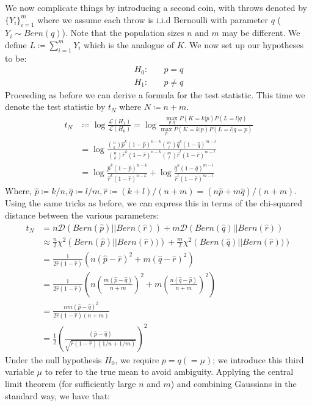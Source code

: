\documentclass[]{article}
\newcommand{\lik}{\mathcal{L}}
\newcommand{\kl}{\mathcal{D}}
\begin{document}
We now complicate things by introducing a second coin, with throws denoted by $\{Y_i\}_{i=1}^{m}$ where we assume each throw is i.i.d Bernoulli with parameter $q$ ($Y_i \sim Bern(q)$). Note that the population sizes $n$ and $m$ may be different. We define $L \coloneqq \sum_{i=1}^{m} Y_i$ which is the analogue of $K$. We now set up our hypotheses to be:
%
\begin{align*}
H_0:& \quad p = q \\
H_1:& \quad p \neq q
\end{align*}
%
Proceeding as before we can derive a formula for the test statistic. This time we denote the test statistic by $t_N$ where $N \coloneqq n + m$.
%
\begin{align*}
t_N &\coloneqq \log \frac{\lik(H_1)}{\lik(H_0)}
= \log \frac{\max_{p,q} P(K=k|p) P(L=l|q)}{\max_p P(K=k|p) P(L=l|q=p)} \\
&= \log \frac
{\binom{n}{k} \hat{p}^k (1 - \hat{p})^{n-k} \binom{m}{l} \hat{q}^k (1 - \hat{q})^{m-l}}
{\binom{n}{k} \hat{r}^k (1 - \hat{r})^{n-k} \binom{m}{l} \hat{r}^l (1 - \hat{r})^{m-l}} \\
&= \log \frac
{ \hat{p}^k (1 - \hat{p})^{n-k}}
{ \hat{r}^k (1 - \hat{r})^{n-k}}
+ \log \frac{\hat{q}^k (1 - \hat{q})^{m-l}}{ \hat{r}^l (1 - \hat{r})^{m-l}}
\end{align*} 
%
Where, $\hat{p} \coloneqq k/n, \hat{q} \coloneqq l/m, \hat{r} \coloneqq (k+l)/(n+m) = (n\hat{p} + m\hat{q})/(n+m)$. Using the same tricks as before, we can express this in terms of the chi-squared distance between the various parameters:
%
\begin{align*}
t_N &= n \kl\left(Bern(\hat{p}) || Bern(\hat{r})\right)
+ m \kl\left(Bern(\hat{q}) || Bern(\hat{r})\right) \\ 
&\approx \frac{n}{2} \chi^2\left(Bern(\hat{p})||Bern(\hat{r}))\right)
+ \frac{m}{2} \chi^2\left(Bern(\hat{q})||Bern(\hat{r}))\right) \\
&= \frac{1}{2\hat{r}(1-\hat{r})} \left(
n(\hat{p} - \hat{r})^2 + m(\hat{q} - \hat{r})^2
\right) \\
&= \frac{1}{2\hat{r}(1-\hat{r})} \left(
n\left( \frac{m(\hat{p} - \hat{q})}{n+m}\right)^2 + 
m\left( \frac{n(\hat{q} - \hat{p})}{n+m}\right)^2
\right) \\
&= \frac{nm(\hat{p} - \hat{q})^2}{2\hat{r}(1-\hat{r})(n+m)} \\
&= \frac{1}{2} \left( \frac{\left(\hat{p} - \hat{q}\right)}{\sqrt{\hat{r}(1-\hat{r})(1/n+1/m)}}  \right)^2
\end{align*}
%
Under the null hypothesis $H_0$, we require $p=q(=\mu)$; we introduce this third variable $\mu$ to refer to the true mean to avoid ambiguity. Applying the central limit theorem (for sufficiently large $n$ and $m$) and combining Gaussians in the standard way, we have that:
\end{document}
